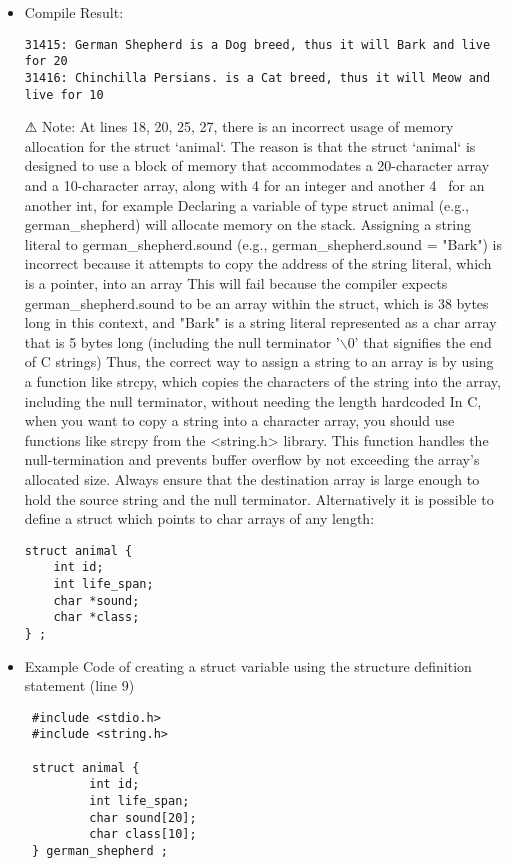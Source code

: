 \begin{itemize}
\item Compile Result:
\begin{lstlisting}
31415: German Shepherd is a Dog breed, thus it will Bark and live for 20
31416: Chinchilla Persians. is a Cat breed, thus it will Meow and live for 10
\end{lstlisting}
\item[⚠] Note: At lines 18, 20, 25, 27, there is an incorrect usage of memory allocation for the struct `animal`.
 The reason is that the struct `animal` is designed to use a block of memory that accommodates a 20-character array
 and a 10-character array, along with 4 for an integer and another 4 \ for an another int, for example
 Declaring a variable of type struct animal (e.g., german\_shepherd) will allocate memory on the stack.
 Assigning a string literal to german\_shepherd.sound (e.g., german\_shepherd.sound = "Bark") is incorrect
 because it attempts to copy the address of the string literal, which is a pointer, into an array
 This will fail because the compiler expects german\_shepherd.sound to be an array within the struct,
 which is 38 bytes long in this context, and "Bark" is a string literal represented as a char array
 that is 5 bytes long (including the null terminator '$\backslash$0' that signifies the end of C strings)
 Thus, the correct way to assign a string to an array is by using a function like strcpy, which copies
 the characters of the string into the array, including the null terminator, without needing the length hardcoded
 In C, when you want to copy a string into a character array, you should use functions like strcpy from the <string.h> library.
 This function handles the null-termination and prevents buffer overflow by not exceeding the array's allocated size.
 Always ensure that the destination array is large enough to hold the source string and the null terminator.
 Alternatively it is possible to define a struct which points to char arrays of any length:
\begin{lstlisting}
struct animal {
    int id;
    int life_span;
    char *sound;
    char *class;
} ;
\end{lstlisting}


\item Example Code of creating a struct variable using the structure definition statement (line 9)
\begin{lstlisting}
 #include <stdio.h>
 #include <string.h>

 struct animal {
         int id;
         int life_span;
         char sound[20];
         char class[10];
 } german_shepherd ;
   

\end{lstlisting}
\end{itemize}
